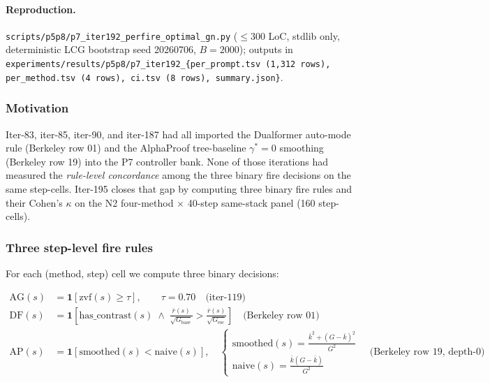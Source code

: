 \documentclass{article}
\begin{document}
\paragraph{Reproduction.}
\texttt{scripts/p5p8/p7\_iter192\_perfire\_optimal\_gn.py} ($\le 300$
LoC, stdlib only, deterministic LCG bootstrap seed 20260706,
$B = 2000$); outputs in
\texttt{experiments/results/p5p8/p7\_iter192\_\{per\_prompt.tsv (1,312
rows), per\_method.tsv (4 rows), ci.tsv (8 rows), summary.json\}}.
 

\subsubsection*{Motivation}

Iter-83, iter-85, iter-90, and iter-187 had all imported the
Dualformer auto-mode rule (Berkeley row 01) and the AlphaProof
tree-baseline $\gamma^*{=}0$ smoothing (Berkeley row 19) into the
P7 controller bank.  None of those iterations had measured the
\emph{rule-level concordance} among the three binary fire decisions
on the same step-cells.  Iter-195 closes that gap by computing
three binary fire rules and their Cohen's $\kappa$ on the N2
four-method $\times$ 40-step same-stack panel (160 step-cells).

\subsubsection*{Three step-level fire rules}

For each (method, step) cell we compute three binary decisions:

\begin{align}
\mathrm{AG}(s) &= \mathbf{1}\!\left[\mathrm{zvf}(s) \ge \tau\right],
\qquad \tau = 0.70 \quad\text{(iter-119)} \\
\mathrm{DF}(s) &= \mathbf{1}\!\left[\mathrm{has\_contrast}(s) \;\wedge\;
\frac{\overline{r}(s)}{\sqrt{G_{\mathrm{base}}}} > \frac{\overline{r}(s)}{\sqrt{G_{\mathrm{esc}}}}\right]
\quad\text{(Berkeley row 01)} \\
\mathrm{AP}(s) &= \mathbf{1}\!\left[\mathrm{smoothed}(s) <
\mathrm{naive}(s)\right], \quad
\begin{cases}
\mathrm{smoothed}(s) = \frac{\bar{k}^2 + (G - \bar{k})^2}{G^2} \\[2pt]
\mathrm{naive}(s) = \frac{\bar{k}(G - \bar{k})}{G^2}
\end{cases}
\quad\text{(Berkeley row 19, depth-0)}
\end{align}
\end{document}
